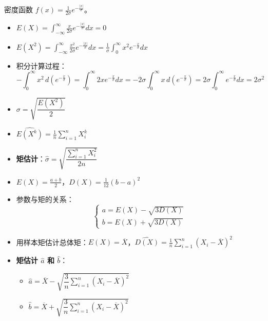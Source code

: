 \begin{example}
密度函数 $f(x)=\frac{1}{2\sigma}e^{-\frac{|x|}{\sigma}}$。
\begin{itemize}
	\item $E(X)=\int_{-\infty}^{\infty}\frac{x}{2\sigma}e^{-\frac{|x|}{\sigma}}dx=0$
	\item $E(X^{2})=\int_{-\infty}^{\infty}\frac{x^{2}}{2\sigma}e^{-\frac{|x|}{\sigma}}dx=\frac{1}{\sigma}\int_{0}^{\infty}x^{2}e^{-\frac{x}{\sigma}}dx$
	\item 积分计算过程：
	\begin{equation*}
		-\int_{0}^{\infty}x^{2}\,d\left(e^{-\frac{x}{\sigma}}\right)=\int_{0}^{\infty}2x e^{-\frac{x}{\sigma}}dx=-2\sigma\int_{0}^{\infty}x\,d\left(e^{-\frac{x}{\sigma}}\right)=2\sigma\int_{0}^{\infty}e^{-\frac{x}{\sigma}}dx=2\sigma^{2}
	\end{equation*}
	\item $\sigma=\sqrt{\dfrac{E(X^{2})}{2}}$
	\item $\hat{E(X^{k})} = \frac{1}{n}\sum_{i=1}^{n}X_{i}^{k}$
	\item \textbf{矩估计}：$\hat{\sigma}=\sqrt{\dfrac{\sum_{i=1}^{n}X_{i}^{2}}{2n}}$
\end{itemize}
\end{example}

\begin{example}
\begin{itemize}
	\item $E(X)=\frac{a+b}{2}$，$D(X)=\frac{1}{12}(b-a)^{2}$
	\item 参数与矩的关系：
	\begin{equation*}
		\begin{cases} a=E(X)-\sqrt{3D(X)}\\ b=E(X)+\sqrt{3D(X)} \end{cases}
	\end{equation*}
	\item 用样本矩估计总体矩：$\hat{E(X)}=\overline{X}$，$\hat{D(X)}=\frac{1}{n}\sum_{i=1}^{n}(X_{i}-\overline{X})^{2}$
	\item \textbf{矩估计 $\hat{a}$ 和 $\hat{b}$}：
	\begin{itemize}
		\item $\hat{a}=\overline{X}-\sqrt{\dfrac{3}{n}\sum_{i=1}^{n}(X_{i}-\overline{X})^{2}}$
		\item $\hat{b}=\overline{X}+\sqrt{\dfrac{3}{n}\sum_{i=1}^{n}(X_{i}-\overline{X})^{2}}$
	\end{itemize}
\end{itemize}
\end{example}

